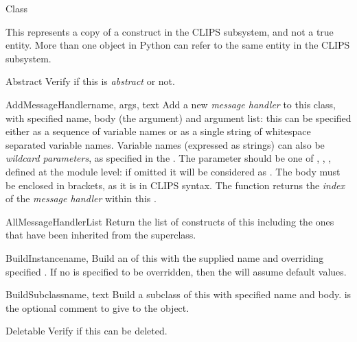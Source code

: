 \begin{classdesc*}{Class}

This represents a copy of a  construct in the CLIPS
subsystem, and not a true  entity. More than one
 object in Python can refer to the same 
entity in the CLIPS subsystem.

\begin{memberdesc}[property]{Abstract}
Verify if this  is \emph{abstract} or not.
\end{memberdesc}

\begin{methoddesc}{AddMessageHandler}{name, args, text }
Add a new \emph{message handler} to this class, with specified name,
body (the  argument) and argument list: this can be
specified either as a sequence of variable names or as a single string
of whitespace separated variable names. Variable names (expressed as
strings) can also be \emph{wildcard parameters}, as specified in the
\clipsbpg{}. The  parameter should be one of ,
, ,  defined at the module level:
if omitted it will be considered as . The body must be
enclosed in brackets, as it is in CLIPS syntax. The function returns
the \emph{index} of the \emph{message handler} within this .
\end{methoddesc}

\begin{methoddesc}{AllMessageHandlerList}{}
Return the list of  constructs of this 
including the ones that have been inherited from the superclass.
\end{methoddesc}

\begin{methoddesc}{BuildInstance}{name, }
Build an  of this  with the supplied name
and overriding specified . If no  is specified
to be overridden, then the  will assume default values.
\end{methoddesc}

\begin{methoddesc}{BuildSubclass}{name, text }
Build a subclass of this  with specified name and body.
 is the optional comment to give to the object.
\end{methoddesc}

\begin{memberdesc}[property]{Deletable}
Verify if this  can be deleted.
\end{memberdesc}


\end{classdesc*}
